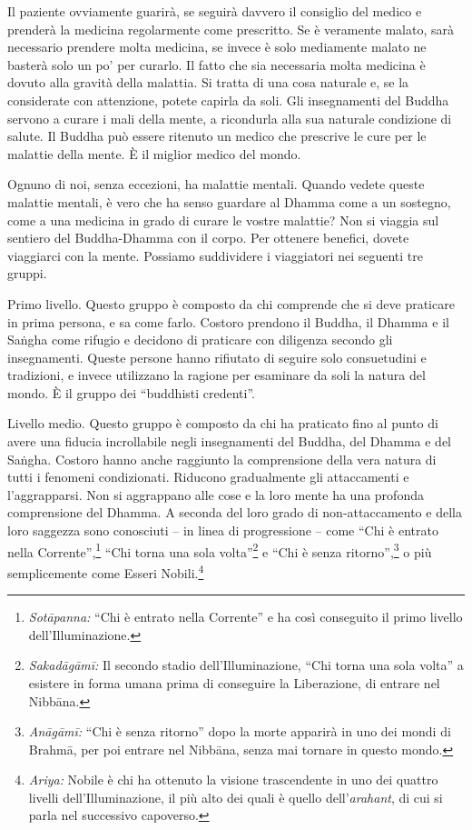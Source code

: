 Il paziente ovviamente guarirà, se seguirà davvero il consiglio del
medico e prenderà la medicina regolarmente come prescritto. Se è
veramente malato, sarà necessario prendere molta medicina, se invece è
solo mediamente malato ne basterà solo un po' per curarlo. Il fatto che
sia necessaria molta medicina è dovuto alla gravità della malattia. Si
tratta di una cosa naturale e, se la considerate con attenzione, potete
capirla da soli. Gli insegnamenti del Buddha servono a curare i mali
della mente, a ricondurla alla sua naturale condizione di salute. Il
Buddha può essere ritenuto un medico che prescrive le cure per le
malattie della mente. È il miglior medico del mondo.

Ognuno di noi, senza eccezioni, ha malattie mentali. Quando vedete
queste malattie mentali, è vero che ha senso guardare al Dhamma come a
un sostegno, come a una medicina in grado di curare le vostre malattie?
Non si viaggia sul sentiero del Buddha-Dhamma con il corpo. Per ottenere
benefici, dovete viaggiarci con la mente. Possiamo suddividere i
viaggiatori nei seguenti tre gruppi.

Primo livello. Questo gruppo è composto da chi comprende che si deve
praticare in prima persona, e sa come farlo. Costoro prendono il Buddha,
il Dhamma e il Saṅgha come rifugio e decidono di praticare con diligenza
secondo gli insegnamenti. Queste persone hanno rifiutato di seguire solo
consuetudini e tradizioni, e invece utilizzano la ragione per esaminare
da soli la natura del mondo. È il gruppo dei ``buddhisti credenti''.

Livello medio. Questo gruppo è composto da chi ha praticato fino al
punto di avere una fiducia incrollabile negli insegnamenti del Buddha,
del Dhamma e del Saṅgha. Costoro hanno anche raggiunto la comprensione
della vera natura di tutti i fenomeni condizionati. Riducono
gradualmente gli attaccamenti e l'aggrapparsi. Non si aggrappano alle
cose e la loro mente ha una profonda comprensione del Dhamma. A seconda
del loro grado di non-attaccamento e della loro saggezza sono conosciuti
-- in linea di progressione -- come ``Chi è entrato nella
Corrente'',\footnote{\emph{Sotāpanna:} ``Chi è entrato nella Corrente''
  e ha così conseguito il primo livello dell'Illuminazione.} ``Chi torna
una sola volta''\footnote{\emph{Sakadāgāmī:} Il secondo stadio
  dell'Illuminazione, ``Chi torna una sola volta'' a esistere in forma
  umana prima di conseguire la Liberazione, di entrare nel
  Nibbāna.} e ``Chi è senza ritorno'',\footnote{\emph{Anāgāmī:}
  ``Chi è senza ritorno'' dopo la morte apparirà in uno dei mondi di
  Brahmā, per poi entrare nel Nibbāna, senza mai tornare in
  questo mondo.} o più semplicemente come Esseri Nobili.\footnote{\emph{Ariya:}
  Nobile è chi ha ottenuto la visione trascendente in uno dei quattro
  livelli dell'Illuminazione, il più alto dei quali è quello
  dell'\emph{arahant}, di cui si parla nel successivo capoverso.}

